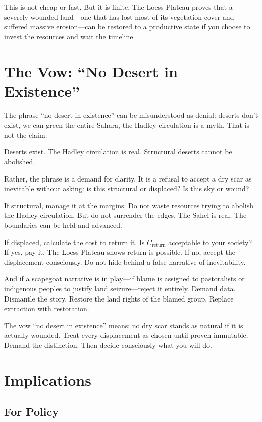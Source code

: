 \documentclass[12pt,a4paper]{article}
\begin{document}
This is not cheap or fast. But it is finite. The Loess Plateau proves that a severely wounded land—one that has lost most of its vegetation cover and suffered massive erosion—can be restored to a productive state if you choose to invest the resources and wait the timeline.

\section{The Vow: ``No Desert in Existence''}

The phrase ``no desert in existence'' can be misunderstood as denial: deserts don't exist, we can green the entire Sahara, the Hadley circulation is a myth. That is not the claim.

Deserts exist. The Hadley circulation is real. Structural deserts cannot be abolished.

Rather, the phrase is a demand for clarity. It is a refusal to accept a dry scar as inevitable without asking: is this structural or displaced? Is this sky or wound?

If structural, manage it at the margins. Do not waste resources trying to abolish the Hadley circulation. But do not surrender the edges. The Sahel is real. The boundaries can be held and advanced.

If displaced, calculate the cost to return it. Is $C_{\text{return}}$ acceptable to your society? If yes, pay it. The Loess Plateau shows return is possible. If no, accept the displacement consciously. Do not hide behind a false narrative of inevitability.

And if a scapegoat narrative is in play—if blame is assigned to pastoralists or indigenous peoples to justify land seizure—reject it entirely. Demand data. Dismantle the story. Restore the land rights of the blamed group. Replace extraction with restoration.

The vow ``no desert in existence'' means: no dry scar stands as natural if it is actually wounded. Treat every displacement as chosen until proven immutable. Demand the distinction. Then decide consciously what you will do.

\section{Implications}

\subsection{For Policy}
\end{document}
